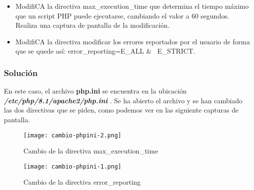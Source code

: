 \begin{itemize}
    \item ModifiCA la directiva max\_execution\_time que determina el tiempo máximo que un script PHP puede ejecutarse, cambiando el valor a 60 segundos. Realiza una captura de pantalla de la modificación.
    \item ModifiCA la directiva modificar los errores reportados por el usuario de forma que se quede así: error\_reporting=E\_ALL \& ~E\_STRICT.
\end{itemize}

\subsubsection{Solución}
En este caso, el archivo \textbf{php.ini} se encuentra en la ubicación \textbf{\textit{/etc/php/8.1/apache2/php.ini
}}. Se ha abierto el archivo y se han cambiado las dos directivas que se piden, como podemos ver en las siguiente capturas de pantalla.

\begin{figure}[H]
    \centering
    \texttt{[image: cambio-phpini-2.png]}
    \caption{Cambio de la directiva max\_execution\_time}
\end{figure}


\begin{figure}[H]
    \centering
    \texttt{[image: cambio-phpini-1.png]}
    \caption{Cambio de la directiva error\_reporting}
\end{figure}


%
%

